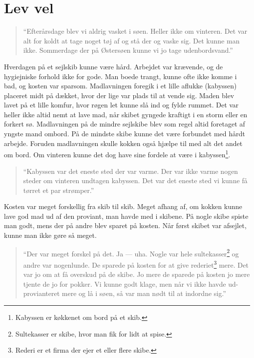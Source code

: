 \chapter{Lev vel}\label{lev-vel}

\begin{quote}
``Efterårsdage blev vi aldrig vasket i søen. Heller ikke om vinteren.
Det var alt for koldt at tage noget tøj af og stå der og vaske sig. Det
kunne man ikke. Sommerdage der på Østersøen kunne vi jo tage
udenbordsvand.''
\end{quote}

Hverdagen på et sejlskib kunne være hård. Arbejdet var krævende, og de
hygiejniske forhold ikke for gode. Man boede trangt, kunne ofte ikke
komme i bad, og kosten var sparsom. Madlavningen foregik i et lille
aflukke (kabyssen) placeret midt på dækket, hvor der lige var plads til
at vende sig. Maden blev lavet på et lille komfur, hvor røgen let kunne
slå ind og fylde rummet. Det var heller ikke altid nemt at lave mad, når
skibet gyngede kraftigt i en storm eller en forkert sø. Madlavningen på
de mindre sejlskibe blev som regel altid foretaget af yngste mand
ombord. På de mindste skibe kunne det være forbundet med hårdt arbejde.
Foruden madlavningen skulle kokken også hjælpe til med alt det andet om
bord. Om vinteren kunne det dog have sine fordele at være i
kabyssen\footnote{Kabyssen er køkkenet om bord på et skib.}.

\begin{quote}
``Kabyssen var det eneste sted der var varme. Der var ikke varme nogen
steder om vinteren undtagen kabyssen. Det var det eneste sted vi kunne
få tørret et par strømper.''
\end{quote}

Kosten var meget forskellig fra skib til skib. Meget afhang af, om
kokken kunne lave god mad ud af den proviant, man havde med i skibene.
På nogle skibe spiste man godt, mens der på andre blev sparet på kosten.
Når først skibet var afsejlet, kunne man ikke gøre så meget.

\begin{quote}
``Der var meget forskel på det. Ja --- uha. Nogle var hele
sultekasser\footnote{Sultekasser er skibe, hvor man fik for lidt at
  spise.} og andre var nogenlunde. De sparede på kosten for at give
rederiet\footnote{Rederi er et firma der ejer et eller flere skibe.}
mere. Det var jo om at få overskud på de skibe. Jo mere de sparede på
kosten jo mere tjente de jo for pokker. Vi kunne godt klage, men når vi
ikke havde ud-provianteret mere og lå i søen, så var man nødt til at
indordne sig.''
\end{quote}

